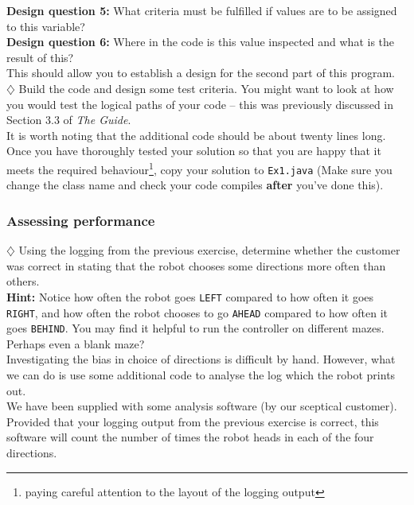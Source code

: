 \noindent
{\bf Design question 5:}
What criteria must be fulfilled if values are to be assigned to this 
variable?\\

\noindent
{\bf Design question 6:}
Where in the code is this value inspected and what is the result of this?\\

\noindent
This should allow you to establish a design for the second part of this 
program. \\

\noindent
$\diamondsuit$ Build the
code and design some test criteria. You might want to look at how you 
would test the logical paths of your code -- this was previously 
discussed in Section 3.3 of {\it The Guide}. \\

\noindent
It is worth noting that the additional code should be about twenty lines 
long. \\

\noindent
Once you have thoroughly tested your solution so that you are happy that it meets the 
required behaviour\footnote{paying careful attention to the layout of the logging output},
copy your solution to {\tt Ex1.java} (Make sure you change the class name and check your code
compiles {\bf after} you've done this).

\subsubsection{Assessing performance}

$\diamondsuit$
Using the logging from the previous exercise, determine whether the customer was 
correct in stating that the robot chooses some directions more often than others.\\

\noindent
{\bf Hint:}
Notice how often the robot goes {\tt LEFT} compared to how often it goes {\tt RIGHT}, and 
how often the robot chooses to go {\tt AHEAD} compared to how often it goes {\tt BEHIND}. 
You may find it helpful to run the controller on different mazes. Perhaps even a blank maze?\\

\noindent
Investigating the bias in choice of directions is difficult by hand. However, 
what we can do is use some additional code to analyse the log which the robot
prints out.\\
  
\noindent
We have been supplied with some analysis software (by our sceptical customer).
Provided that your logging output from the previous exercise is correct, this
software will count the number of times the robot heads in each of the four 
directions. \\

